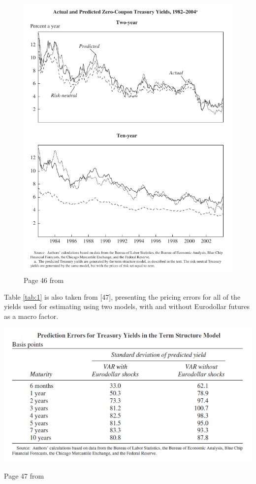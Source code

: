 \documentclass{article}
\numberwithin{equation}{section}
\begin{document}
\begin{figure}[htp]
  \begin{center}
    \includegraphics[scale=0.6]{./figures/bern_fig1.png}
  \end{center}
  \caption{Page 46 from \citet{sack2005monetary}}
  \label{fig:bern_fig1}
\end{figure}

Table \ref{tab:1} is also taken from \citet{sack2005monetary}[47],
presenting the pricing errors for all of the yields used for estimating using
two models, with and without Eurodollar futures as a macro factor.

\begin{table}[htp]
  \begin{center}
    \includegraphics[scale=0.6]{./figures/bern_fig2.png}
  \end{center}
  \caption{Page 47 from \citet{sack2005monetary}}
  \label{tab:1}
\end{table}
\end{document}
